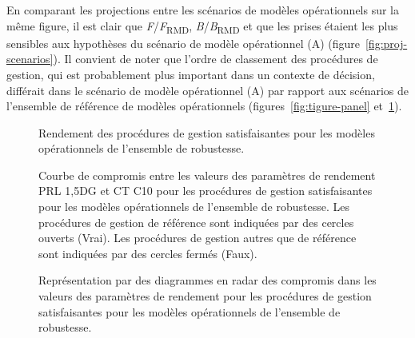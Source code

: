 \documentclass[french,11pt]{book}
\begin{document}
En comparant les projections entre les scénarios de modèles opérationnels sur la même figure, il est clair que \emph{F}/\emph{F}\textsubscript{RMD}, \emph{B}/\emph{B}\textsubscript{RMD} et que les prises étaient les plus sensibles aux hypothèses du scénario de modèle opérationnel (A) (figure~\ref{fig:proj-scenarios}). Il convient de noter que l'ordre de classement des procédures de gestion, qui est probablement plus important dans un contexte de décision, différait dans le scénario de modèle opérationnel (A) par rapport aux scénarios de l'ensemble de référence de modèles opérationnels (figures~\ref{fig:tigure-panel} et~\ref{fig:tigure-panel-rob}).


\begin{figure}[htb]

{\centering {} 

}

\caption{Rendement des procédures de gestion satisfaisantes pour les modèles opérationnels de l'ensemble de robustesse.}\label{fig:tigure-panel-rob}
\end{figure}
\begin{figure}[htb]

{\centering {} 

}

\caption{Courbe de compromis entre les valeurs des paramètres de rendement PRL 1,5DG et CT C10 pour les procédures de gestion satisfaisantes pour les modèles opérationnels de l’ensemble de robustesse. Les procédures de gestion de référence sont indiquées par des cercles ouverts (Vrai). Les procédures de gestion autres que de référence sont indiquées par des cercles fermés (Faux).}\label{fig:tradeoff-robust}
\end{figure}
\begin{figure}[htb]

{\centering {} 

}

\caption{Représentation par des diagrammes en radar des compromis dans les valeurs des paramètres de rendement pour les procédures de gestion satisfaisantes pour les modèles opérationnels de l’ensemble de robustesse.}\label{fig:spider-satisficed-mps-robust}
\end{figure}
\end{document}
